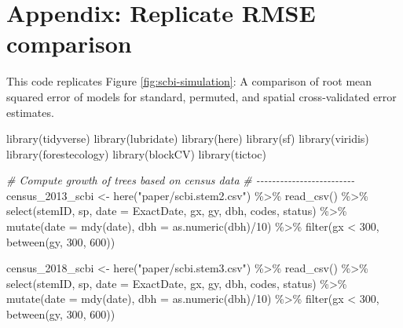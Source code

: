 \documentclass[12pt]{article}
\newenvironment{Shaded}{\begin{snugshade}}{\end{snugshade}}
\newcommand{\AttributeTok}[1]{\textcolor[rgb]{0.77,0.63,0.00}{#1}}
\newcommand{\CommentTok}[1]{\textcolor[rgb]{0.56,0.35,0.01}{\textit{#1}}}
\newcommand{\DecValTok}[1]{\textcolor[rgb]{0.00,0.00,0.81}{#1}}
\newcommand{\FunctionTok}[1]{\textcolor[rgb]{0.00,0.00,0.00}{#1}}
\newcommand{\NormalTok}[1]{#1}
\newcommand{\OtherTok}[1]{\textcolor[rgb]{0.56,0.35,0.01}{#1}}
\newcommand{\SpecialCharTok}[1]{\textcolor[rgb]{0.00,0.00,0.00}{#1}}
\newcommand{\StringTok}[1]{\textcolor[rgb]{0.31,0.60,0.02}{#1}}
\begin{document}
\hypertarget{appendix-replicate-rmse-comparison}{%
\section{Appendix: Replicate RMSE
comparison}\label{appendix-replicate-rmse-comparison}}

This code replicates Figure \ref{fig:scbi-simulation}: A comparison of
root mean squared error of models for standard, permuted, and spatial
cross-validated error estimates.

\begin{Shaded}
\begin{Highlighting}[]
\FunctionTok{library}\NormalTok{(tidyverse)}
\FunctionTok{library}\NormalTok{(lubridate)}
\FunctionTok{library}\NormalTok{(here)}
\FunctionTok{library}\NormalTok{(sf)}
\FunctionTok{library}\NormalTok{(viridis)}
\FunctionTok{library}\NormalTok{(forestecology)}
\FunctionTok{library}\NormalTok{(blockCV)}
\FunctionTok{library}\NormalTok{(tictoc)}


\CommentTok{\# Compute growth of trees based on census data}
\CommentTok{\# {-}{-}{-}{-}{-}{-}{-}{-}{-}{-}{-}{-}{-}{-}{-}{-}{-}{-}{-}{-}{-}{-}{-}{-}{-}}
\NormalTok{census\_2013\_scbi }\OtherTok{\textless{}{-}} \FunctionTok{here}\NormalTok{(}\StringTok{"paper/scbi.stem2.csv"}\NormalTok{) }\SpecialCharTok{\%\textgreater{}\%}
    \FunctionTok{read\_csv}\NormalTok{() }\SpecialCharTok{\%\textgreater{}\%}
    \FunctionTok{select}\NormalTok{(stemID, sp, }\AttributeTok{date =}\NormalTok{ ExactDate, gx, gy, dbh, codes, status) }\SpecialCharTok{\%\textgreater{}\%}
    \FunctionTok{mutate}\NormalTok{(}\AttributeTok{date =} \FunctionTok{mdy}\NormalTok{(date), }\AttributeTok{dbh =} \FunctionTok{as.numeric}\NormalTok{(dbh)}\SpecialCharTok{/}\DecValTok{10}\NormalTok{) }\SpecialCharTok{\%\textgreater{}\%}
    \FunctionTok{filter}\NormalTok{(gx }\SpecialCharTok{\textless{}} \DecValTok{300}\NormalTok{, }\FunctionTok{between}\NormalTok{(gy, }\DecValTok{300}\NormalTok{, }\DecValTok{600}\NormalTok{))}

\NormalTok{census\_2018\_scbi }\OtherTok{\textless{}{-}} \FunctionTok{here}\NormalTok{(}\StringTok{"paper/scbi.stem3.csv"}\NormalTok{) }\SpecialCharTok{\%\textgreater{}\%}
    \FunctionTok{read\_csv}\NormalTok{() }\SpecialCharTok{\%\textgreater{}\%}
    \FunctionTok{select}\NormalTok{(stemID, sp, }\AttributeTok{date =}\NormalTok{ ExactDate, gx, gy, dbh, codes, status) }\SpecialCharTok{\%\textgreater{}\%}
    \FunctionTok{mutate}\NormalTok{(}\AttributeTok{date =} \FunctionTok{mdy}\NormalTok{(date), }\AttributeTok{dbh =} \FunctionTok{as.numeric}\NormalTok{(dbh)}\SpecialCharTok{/}\DecValTok{10}\NormalTok{) }\SpecialCharTok{\%\textgreater{}\%}
    \FunctionTok{filter}\NormalTok{(gx }\SpecialCharTok{\textless{}} \DecValTok{300}\NormalTok{, }\FunctionTok{between}\NormalTok{(gy, }\DecValTok{300}\NormalTok{, }\DecValTok{600}\NormalTok{))}


\end{Highlighting}
\end{Shaded}
\end{document}
